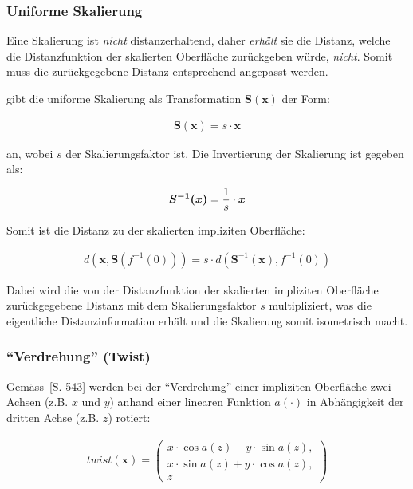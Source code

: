 \subsubsection{Uniforme Skalierung}
\label{ssubsec:implicit_surfaces_ops_scaling}

Eine Skalierung ist \textit{nicht} distanzerhaltend, daher \textit{erhält} sie die Distanz, welche die
Distanzfunktion der skalierten Oberfläche zurückgeben würde, \textit{nicht}.
Somit muss die zurückgegebene Distanz entsprechend angepasst werden.

\cite{hart_sphere_1994} gibt die uniforme Skalierung als Transformation $\bm{S(x)}$  der Form:

\begin{gather}
    \bm{S(x)} = s \cdot \bm{x}
\end{gather}

an, wobei $s$ der Skalierungsfaktor ist. Die Invertierung der Skalierung ist gegeben als:

\begin{gather}
    \bm{S^{-1}(x)} = {1 \over s} \cdot \bm{x}
\end{gather}

Somit ist die Distanz zu der skalierten impliziten Oberfläche:

\begin{gather}
    d(\bm{x}, \bm{S}(f^{-1}(0))) = s \cdot d(\bm{S}^{-1}(\bm{x}), f^{-1}(0))
\end{gather}

Dabei wird die von der Distanzfunktion der skalierten impliziten Oberfläche
zurückgegebene Distanz mit dem Skalierungsfaktor $s$ multipliziert, was die
eigentliche Distanzinformation erhält und die Skalierung somit isometrisch
macht.

\subsubsection{``Verdrehung'' (Twist)}
\label{ssubsec:implicit_surfaces_ops_twist}

Gemäss~\cite{hart_sphere_1994}[S. 543] werden bei der ``Verdrehung'' einer
impliziten Oberfläche zwei Achsen (z.B. $x$ und $y$) anhand einer linearen Funktion $a(\cdot)$ in
Abhängigkeit der dritten Achse (z.B. $z$) rotiert:

\begin{gather}
    twist(\bm{x}) = \begin{pmatrix} 
        x \cdot \cos{a(z)} - y \cdot \sin{a(z)},\\
        x \cdot \sin{a(z)} + y \cdot \cos{a(z)},\\
        z
    \end{pmatrix}
\end{gather}

